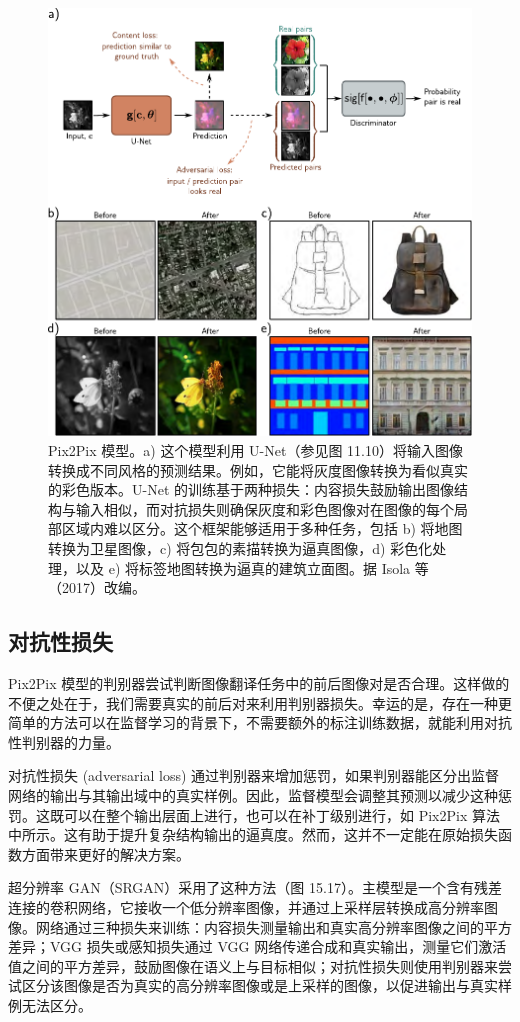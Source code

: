 \documentclass[lang=cn,newtx,10pt,scheme=chinese]{elegantbook}
\begin{document}
\begin{figure}[ht!]
\centering
\includegraphics[width=0.7\linewidth]{PDFFigures/UDLChap15PDF/GANPix2Pix_C.pdf}
\caption{Pix2Pix 模型。a) 这个模型利用 U-Net（参见图 11.10）将输入图像转换成不同风格的预测结果。例如，它能将灰度图像转换为看似真实的彩色版本。U-Net 的训练基于两种损失：内容损失鼓励输出图像结构与输入相似，而对抗损失则确保灰度和彩色图像对在图像的每个局部区域内难以区分。这个框架能够适用于多种任务，包括 b) 将地图转换为卫星图像，c) 将包包的素描转换为逼真图像，d) 彩色化处理，以及 e) 将标签地图转换为逼真的建筑立面图。据 Isola 等（2017）改编。}
\end{figure}


\subsection{对抗性损失}
Pix2Pix 模型的判别器尝试判断图像翻译任务中的前后图像对是否合理。这样做的不便之处在于，我们需要真实的前后对来利用判别器损失。幸运的是，存在一种更简单的方法可以在监督学习的背景下，不需要额外的标注训练数据，就能利用对抗性判别器的力量。

对抗性损失 (adversarial loss) 通过判别器来增加惩罚，如果判别器能区分出监督网络的输出与其输出域中的真实样例。因此，监督模型会调整其预测以减少这种惩罚。这既可以在整个输出层面上进行，也可以在补丁级别进行，如 Pix2Pix 算法中所示。这有助于提升复杂结构输出的逼真度。然而，这并不一定能在原始损失函数方面带来更好的解决方案。

超分辨率 GAN（SRGAN）采用了这种方法（图 15.17）。主模型是一个含有残差连接的卷积网络，它接收一个低分辨率图像，并通过上采样层转换成高分辨率图像。网络通过三种损失来训练：内容损失测量输出和真实高分辨率图像之间的平方差异；VGG 损失或感知损失通过 VGG 网络传递合成和真实输出，测量它们激活值之间的平方差异，鼓励图像在语义上与目标相似；对抗性损失则使用判别器来尝试区分该图像是否为真实的高分辨率图像或是上采样的图像，以促进输出与真实样例无法区分。
\end{document}
